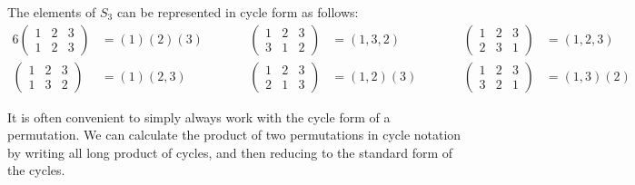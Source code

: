 \begin{example}
  The elements of $S_{3}$ can be represented in cycle form as follows:
  \begin{alignat*}{6}
    \begin{pmatrix}
      1 & 2 & 3 \\
      1 & 2 & 3
    \end{pmatrix} &= (1)(2)(3) &\qquad&
    \begin{pmatrix}
      1 & 2 & 3 \\
      3 & 1 & 2
    \end{pmatrix} &= (1, 3, 2) &\qquad&
    \begin{pmatrix}
      1 & 2 & 3 \\
      2 & 3 & 1
    \end{pmatrix} &= (1, 2, 3)\\
    \begin{pmatrix}
      1 & 2 & 3 \\
      1 & 3 & 2
    \end{pmatrix} &= (1)(2, 3) &&
    \begin{pmatrix}
      1 & 2 & 3 \\
      2 & 1 & 3
    \end{pmatrix} &= (1, 2)(3)&&
    \begin{pmatrix}
      1 & 2 & 3 \\
      3 & 2 & 1
    \end{pmatrix} &= (1, 3)(2)
  \end{alignat*}
\end{example}

It is often convenient to simply always work with the cycle form of a
permutation. We can calculate the product of two permutations in cycle
notation by writing all long product of cycles, and then reducing to
the standard form of the cycles.

